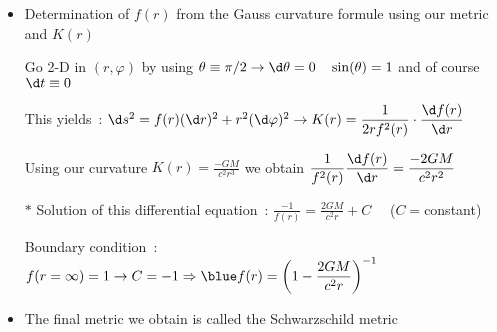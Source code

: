 \Tr
\begin{itemize}
\item Determination of $f(r)$ from the Gauss curvature formule using our metric and $K(r)$
\item[] Go 2-D in $(r,\varphi)$ by using $\theta \equiv \pi/2 \rightarrow \d\theta=0 \quad \sin(\theta)=1$
        and of course $\d t \equiv 0$
\item[] This yields~: $\d s^{2}=f(r)(\d r)^{2}+r^{2}(\d\varphi)^{2}
        \rightarrow \displaystyle K(r)=\frac{1}{2rf^{2}(r)}\cdot\frac{\d f(r)}{\d r}$
\item[] Using our curvature $\displaystyle K(r)=\frac{-GM}{c^{2}r^{3}}$ we obtain
        $\displaystyle \frac{1}{f^{2}(r)}\frac{\d f(r)}{\d r}=\frac{-2GM}{c^{2}r^{2}}$
\item[$\ast$] Solution of this differential equation~:
              $\displaystyle \frac{-1}{f(r)}=\frac{2GM}{c^{2}r}+C \quad$ ($C=$constant)
\item[] Boundary condition~: $f(r=\infty)=1 \rightarrow C=-1
        \Rightarrow {\displaystyle \blue f(r)=\left(1-\frac{2GM}{c^{2}r}\right)^{-1}}$
\item The final metric we obtain is called the {\blue Schwarzschild metric}\\
\item[]{\red {}}
\end{itemize}

